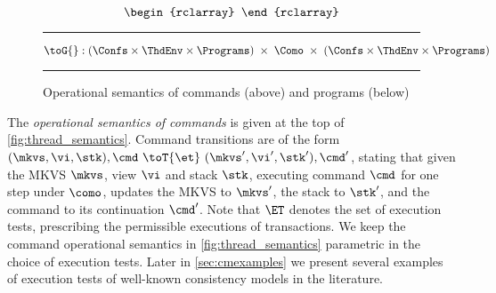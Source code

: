 \begin{figure}[!t]
\[\begin{rclarray}
\end{rclarray}
\]
\vspace{5pt}
\hrule%
\[
	\toG{} : 
    ( \Confs \times \ThdEnv \times \Programs) 
    \;\times\; \Como \;\times\;
    ( \Confs \times \ThdEnv \times \Programs) 
\]
\begin{mathpar}
\end{mathpar}
%
\hrule
\caption{Operational semantics of commands (above) and programs (below)}
\label{def:thread_semantics}
\label{fig:thread_semantics}
\label{def:thread_pool_semantics}
\label{fig:thread_pool_semantics}
\label{def:program_semantics}
\label{fig:program_semantics}
\end{figure}


The \emph{operational semantics of commands} is given at the top of \cref{fig:thread_semantics}. 
Command transitions are of the form $(\mkvs, \vi, \stk), \cmd \ \toT{\et} \ (\mkvs', \vi', \stk') , \cmd'$, stating that given the MKVS $\mkvs$, view $\vi$ and stack $\stk$, executing command $\cmd$ for one step under $\como$, updates the MKVS to $\mkvs'$, the stack to $\stk'$, and the command to its continuation $\cmd'$. 
Note that $\ET$ denotes the set of execution tests, prescribing the permissible executions of transactions. 
We keep the command operational semantics in \cref{fig:thread_semantics} parametric in the choice of execution tests. 
Later in \cref{sec:cmexamples} we present several examples of execution tests of well-known consistency models in the literature. 

